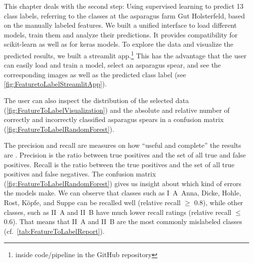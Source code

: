 \bigskip
This chapter deals with the second step: Using supervised learning to predict 13 class labels, referring to the classes at the asparagus farm Gut Holsterfeld, based on the manually labeled features. We built a unified interface to load different models, train them and analyze their predictions. It provides compatibility for scikit-learn as well as for keras models. To explore the data and visualize the predicted results, we built a streamlit app.\footnote{inside code/pipeline in the GitHub repository} This has the advantage that the user can easily load and train a model, select an asparagus spear, and see the corresponding images as well as the predicted class label (see \autoref{fig:FeaturetoLabelStreamlitApp}).

The user can also inspect the distribution of the selected data (\autoref{fig:FeatureToLabelVisualization}) and the absolute and relative number of correctly and incorrectly classified asparagus spears in a confusion matrix (\autoref{fig:FeatureToLabelRandomForest}).

The precision and recall are measures on how \enquote{useful and complete} the results are \citep{wiki:precisionrecall}. Precision is the ratio between true positives and the set of all true and false positives. Recall is the ratio between the true positives and the set of all true positives and false negatives. The confusion matrix (\autoref{fig:FeatureToLabelRandomForest}) gives us insight about which kind of errors the models make. We can observe that classes such as I~A~Anna, Dicke, Hohle, Rost, Köpfe, and Suppe can be recalled well (relative recall $\geq$ 0.8), while other classes, such as II~A and II~B have much lower recall ratings (relative recall $\leq$ 0.6). That means that II~A and II~B are the most commonly mislabeled classes (cf.~\autoref{tab:FeatureToLabelReport}).


